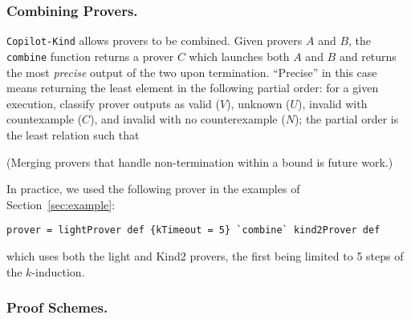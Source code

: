 %


\subsubsection{Combining Provers.}\label{combining-provers}
\texttt{Copilot-Kind} allows provers to be combined. Given provers $A$ and $B$,
the \texttt{combine} function returns a prover $C$ which launches both $A$ and
$B$ and returns the most \emph{precise} output of the two upon
termination. ``Precise'' in this case means returning the least element
in the following partial order: for a given execution, classify prover outputs
as valid ($V$), unknown ($U$), invalid with countexample ($C$), and invalid with
no counterexample ($N$); the partial order is the least relation such that

\begin{center}
\end{center}


\noindent
(Merging provers
that handle non-termination within a bound is future work.)

In practice, we used the following prover in the examples of Section~\ref{sec:example}:
\begin{lstlisting}[frame=single]
prover = lightProver def {kTimeout = 5} `combine` kind2Prover def
\end{lstlisting}
which uses both the light and Kind2 provers, the first being limited to 5 steps of the $k$-induction.

\subsubsection{Proof Schemes.}\label{proof-schemes}

